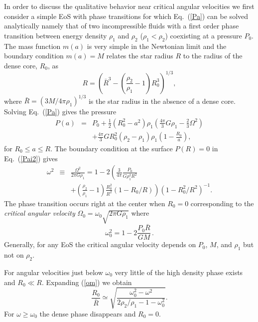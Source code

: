 \begin{multicols}{2}
In order to discuss the qualitative behavior near critical angular
velocities we first consider a simple EoS with phase transitions for which
Eq.\ (\ref{Pa}) can be solved analytically namely that of
two incompressible fluids with a first order phase transition
between energy density
$\rho_1$ and $\rho_2$ ($\rho_1<\rho_2$) 
coexisting at a pressure $P_0$.
The mass function $m(a)$ is very simple 
in the Newtonian limit and the boundary condition $m(a)=M$
relates the star radius $R$ to the radius of the dense core, $R_0$, as
\begin{equation}
    R = \left(\bar{R}^3-(\frac{\rho_2}{\rho_1}-1)R_0^3\right)^{1/3}, 
\end{equation}
where $\bar{R}=(3M/4\pi\rho_1)^{1/3}$ is the star radius
in the absence of a dense core.
Solving Eq.\ (\ref{Pa}) gives the pressure
\begin{eqnarray}
    P(a)&=&P_0+\frac{1}{2}(R_0^2-a^2)\rho_1(\frac{4\pi}{3}G\rho_1
     -\frac{2}{3}\Omega^2)\nonumber \\ 
    && +\frac{4\pi}{3}GR_0^2(\rho_2-\rho_1)\rho_1(1-\frac{R_0}{a}),
     \label{Pai2}
\end{eqnarray}
for $R_0\le a\le R$.
The boundary condition at the surface $P(R)=0$ in
Eq.\  (\ref{Pai2}) gives 
\begin{eqnarray}
  \omega^2 & \equiv &\frac{\Omega^2}{2\pi G\rho_1}
  = 1-2\left(\frac{3}{4\pi}\frac{P_0}{G\rho_1^2R^2} \right. \nonumber \\
    & & \left. +(\frac{\rho_2}{\rho_1}-1)\frac{R_0^2}{R^2}(1-R_0/R) \right)
               (1-R_0^2/R^2)^{-1}. \label{om}
\end{eqnarray}
The phase transition occurs right at the center when $R_0=0$ corresponding to
the {\it critical angular velocity} $\Omega_0=\omega_0\sqrt{2\pi G\rho_1}$
where
\begin{equation}
   \omega_0^2= 1-2\frac{P_0\bar{R}}{GM} 
   \, .\label{o0}
\end{equation}
Generally, for any EoS the critical angular velocity depends on $P_0$, $M$, 
and $\rho_1$ but not on $\rho_2$.

For angular velocities just below $\omega_0$ very little of 
the high density phase exists and $R_0\ll R$. Expanding (\ref{om}) we obtain
\begin{equation}
  \frac{R_0}{\bar{R}} \simeq \sqrt{\frac{\omega_0^2-\omega^2}
             {2\rho_2/\rho_1-1-\omega_0^2}}. 
  \label{R0}
\end{equation}
For $\omega\ge\omega_0$ the dense phase disappears and $R_0=0$.


\end{multicols}
